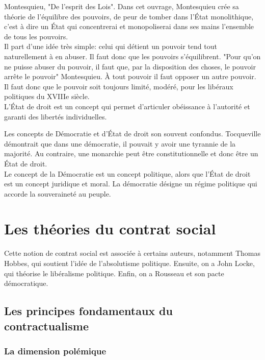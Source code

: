 \documentclass[10pt, a4paper, openany]{book}
\begin{document}
Montesquieu, "De l'esprit des Lois". Dans cet ouvrage, Montesquieu crée sa théorie de l'équilibre des pouvoirs, de peur de tomber dans l'État monolithique, c'est à dire un État qui concentrerai et monopoliserai dans ses mains l'ensemble de tous les pouvoirs. \\
Il part d'une idée très simple: celui qui détient un pouvoir tend tout naturellement à en abuser. Il faut donc que les pouvoirs s'équilibrent. "Pour qu'on ne puisse abuser du pouvoir, il faut que, par la disposition des choses, le pouvoir arrête le pouvoir" Montesquieu. À tout pouvoir il faut opposer un autre pouvoir. Il faut donc que le pouvoir soit toujours limité, modéré, pour les libéraux politiques du XVIIIe siècle. \\
L'État de droit est un concept qui permet d'articuler obéissance à l'autorité et garanti des libertés individuelles. 


Les concepts de Démocratie et d'État de droit son souvent confondus. Tocqueville démontrait que dans une démocratie, il pouvait y avoir une tyrannie de la majorité. Au contraire, une monarchie peut être constitutionnelle et donc être un État de droit. \\
Le concept de la Démocratie est un concept politique, alors que l'État de droit est un concept juridique et moral. La démocratie désigne un régime politique qui accorde la souveraineté au peuple. 

\section{Les théories du contrat social}

Cette notion de contrat social est associée à certains auteurs, notamment Thomas Hobbes, qui soutient l'idée de l'absolutisme politique. Ensuite, on a John Locke, qui théorise le libéralisme politique. Enfin, on a Rousseau et son pacte démocratique. 

\subsection{Les principes fondamentaux du contractualisme}

\subsubsection{La dimension polémique}
\end{document}
